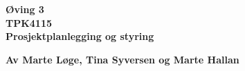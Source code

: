 \begin{titlepage}
\begin{center}

{\Huge \bf Øving 3} \\[1.0cm]
{\Huge \bf TPK4115} \\[1.0cm]
{\Large \bf Prosjektplanlegging og styring} \\[1.0cm]
\vspace{1cm}

{\bf Av Marte Løge, Tina Syversen og Marte Hallan}


\end{center}
\end{titlepage}